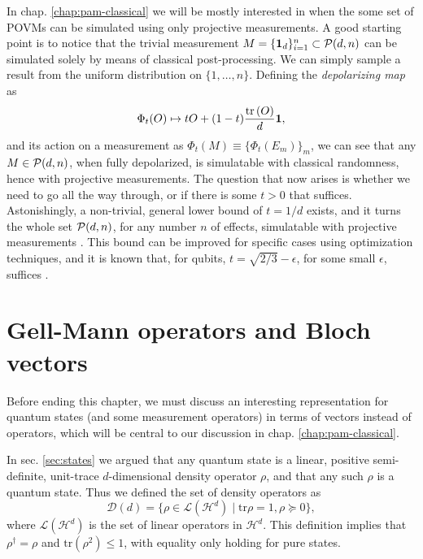 		In chap. \ref{chap:pam-classical} we will be mostly interested in when the some set of POVMs can be simulated using only projective measurements. A good starting point is to notice that the trivial measurement $M = \{ \mathbf{1}_d \}_{i=1}^n \subset \mathcal{P}(d,n)$ can be simulated solely by means of classical post-processing. We can simply sample a result from the uniform distribution on $\{ 1, \ldots, n \}$. Defining the \emph{depolarizing map} as 
		\begin{equation}
			\Phi_t(O) \mapsto t O + (1-t) \frac{ \text{tr}\left( O \right) }{d} \mathbf{1} ,
			\label{eq:depolarizing-map}
		\end{equation}
		and its action on a measurement as $\Phi_t (M) \equiv \{ \Phi_t(E_m) \}_m$, we can see that any $M \in \mathcal{P}(d,n)$, when fully depolarized, is simulatable with classical randomness, hence with projective measurements. The question that now arises is whether we need to go all the way through, or if there is some $t > 0$ that suffices. Astonishingly, a non-trivial, general lower bound of $t = 1/d$ exists, and it turns the whole set $\mathcal{P}(d,n)$, for any number $n$ of effects, simulatable with projective measurements \cite{oszmaniec_2017_simulating}. This bound can be improved for specific cases using optimization techniques, and it is known that, for qubits, $t = \sqrt{2/3} - \epsilon$, for some small $\epsilon$, suffices \cite{guerini_tese}.
		

	\section{Gell-Mann operators and Bloch vectors}
	\label{sec:gell-mann}

		Before ending this chapter, we must discuss an interesting representation for quantum states (and some measurement operators) in terms of vectors instead of operators, which will be central to our discussion in chap. \ref{chap:pam-classical}.

		In sec. \ref{sec:states} we argued that any quantum state is a linear, positive semi-definite, unit-trace $d$-dimensional density operator $\rho$, and that any such $\rho$ is a quantum state. Thus we defined the set of density operators as
		$$
			\mathcal{D}(d) = \{ \rho \in \mathcal{L}(\mathcal{H}^d) \mid \text{tr}\rho=1, \rho \succeq0 \} ,
		$$
		where $\mathcal{L}(\mathcal{H}^d)$ is the set of linear operators in $\mathcal{H}^d$. This definition implies that $\rho^\dagger = \rho$ and $\text{tr}(\rho^2) \leq 1$, with equality only holding for pure states.

